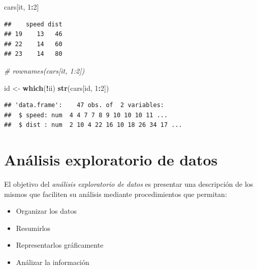 \documentclass[]{book}
\newenvironment{Shaded}{\begin{snugshade}}{\end{snugshade}}
\newcommand{\KeywordTok}[1]{\textcolor[rgb]{0.13,0.29,0.53}{\textbf{#1}}}
\newcommand{\DecValTok}[1]{\textcolor[rgb]{0.00,0.00,0.81}{#1}}
\newcommand{\StringTok}[1]{\textcolor[rgb]{0.31,0.60,0.02}{#1}}
\newcommand{\CommentTok}[1]{\textcolor[rgb]{0.56,0.35,0.01}{\textit{#1}}}
\newcommand{\OperatorTok}[1]{\textcolor[rgb]{0.81,0.36,0.00}{\textbf{#1}}}
\newcommand{\NormalTok}[1]{#1}
\providecommand{\tightlist}{%
  \setlength{\itemsep}{0pt}\setlength{\parskip}{0pt}}
\begin{document}
\begin{Shaded}
\begin{Highlighting}[]
\NormalTok{cars[it, }\DecValTok{1}\OperatorTok{:}\DecValTok{2}\NormalTok{]}
\end{Highlighting}
\end{Shaded}

\begin{verbatim}
##    speed dist
## 19    13   46
## 22    14   60
## 23    14   80
\end{verbatim}

\begin{Shaded}
\begin{Highlighting}[]
\CommentTok{# rownames(cars[it, 1:2])}

\NormalTok{id <-}\StringTok{ }\KeywordTok{which}\NormalTok{(}\OperatorTok{!}\NormalTok{ii)}
\KeywordTok{str}\NormalTok{(cars[id, }\DecValTok{1}\OperatorTok{:}\DecValTok{2}\NormalTok{])}
\end{Highlighting}
\end{Shaded}

\begin{verbatim}
## 'data.frame':    47 obs. of  2 variables:
##  $ speed: num  4 4 7 7 8 9 10 10 10 11 ...
##  $ dist : num  2 10 4 22 16 10 18 26 34 17 ...
\end{verbatim}

\begin{Shaded}
\end{Shaded}

\chapter{Análisis exploratorio de
datos}\label{analisis-exploratorio-de-datos}

El objetivo del \emph{análisis exploratorio de datos} es presentar una
descripción de los mismos que faciliten su análisis mediante
procedimientos que permitan:

\begin{itemize}
\tightlist
\item
  Organizar los datos
\item
  Resumirlos
\item
  Representarlos gráficamente
\item
  Análizar la información
\end{itemize}
\end{document}
